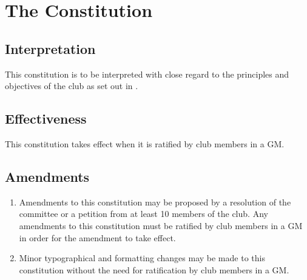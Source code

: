 \documentclass{constitution}
\begin{document}
\section{The Constitution}
\subsection{Interpretation}
This constitution is to be interpreted with close regard to the principles and objectives of the club as set out in .

\subsection{Effectiveness}
This constitution takes effect when it is ratified by club members in a GM.

\subsection{Amendments}
\begin{enumerate}[(1)]
    \item Amendments to this constitution may be proposed by a resolution of the committee or a petition from at least 10 members of the club. Any amendments to this constitution must be ratified by club members in a GM in order for the amendment to take effect.
    \item Minor typographical and formatting changes may be made to this constitution without the need for ratification by club members in a GM.
\end{enumerate}

\newpage

\end{document}
